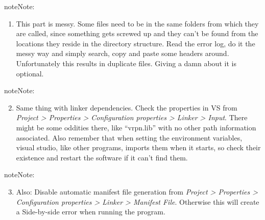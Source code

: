 \documentclass[letterpaper,10pt,english]{sphinxmanual}
\begin{document}
\begin{notice}{note}{Note:}\begin{enumerate}
\item {} 
This part is messy. Some files need to be in the same folders from which they are called, since something gets screwed up and they can't be found from the locations they reside in the directory structure. Read the error log, do it the messy way and simply search, copy and paste some headers around. Unfortunately this results in duplicate files. Giving a damn about it is optional.

\end{enumerate}
\end{notice}

\begin{notice}{note}{Note:}\begin{enumerate}
\setcounter{enumi}{1}
\item {} 
Same thing with linker dependencies. Check the properties in VS from \emph{Project \textgreater{} Properties \textgreater{} Configuration properties \textgreater{} Linker \textgreater{} Input}. There might be some oddities there, like ``vrpn.lib'' with no other path information associated. Also remember that when setting the environment variables, visual studio, like other programs, imports them when it starts, so check their existence and restart the software if it can't find them.

\end{enumerate}
\end{notice}

\begin{notice}{note}{Note:}\begin{enumerate}
\setcounter{enumi}{2}
\item {} 
Also: Disable automatic manifest file generation from \emph{Project \textgreater{} Properties \textgreater{} Configuration properties \textgreater{} Linker \textgreater{} Manifest File}. Otherwise this will create a Side-by-side error when running the program.

\end{enumerate}
\end{notice}
\end{document}
